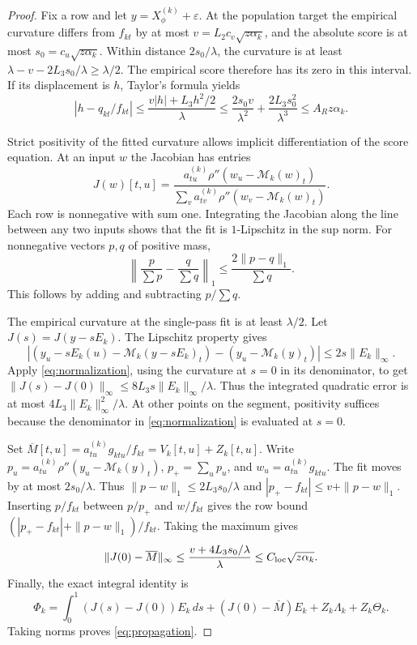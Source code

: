 \documentclass[11pt]{article}
\newcommand{\norm}[1]{\lVert#1\rVert}
\theoremstyle{remark}
\begin{document}
\begin{proof}
Fix a row and let \(y=X_\phi^{(k)}+\varepsilon\).
At the population target the empirical curvature differs from \(f_{kt}\)
by at most \(v=L_2c_v\sqrt{z\alpha_k}\), and the absolute score is at most
\(s_0=c_u\sqrt{z\alpha_k}\).
Within distance \(2s_0/\lambda\), the curvature is at least
\(\lambda-v-2L_3s_0/\lambda\ge\lambda/2\).
The empirical score therefore has its zero in this interval.
If its displacement is \(h\), Taylor's formula yields
\[
 |h-q_{kt}/f_{kt}|
 \le\frac{v|h|+L_3h^2/2}{\lambda}
 \le\frac{2s_0v}{\lambda^2}+\frac{2L_3s_0^2}{\lambda^3}
 \le A_Rz\alpha_k .
\]

Strict positivity of the fitted curvature allows implicit differentiation
of the score equation. At an input \(w\) the Jacobian has entries
\[
 J(w)[t,u]=
 \frac{a_{tu}^{(k)}\rho''(w_u-\mathcal M_k(w)_t)}
      {\sum_v a_{tv}^{(k)}\rho''(w_v-\mathcal M_k(w)_t)}.
\]
Each row is nonnegative with sum one. Integrating the Jacobian along
the line between any two inputs shows that the fit is \(1\)-Lipschitz in
the sup norm. For nonnegative vectors \(p,q\) of
positive mass,
\begin{equation}
 \left\|\frac p{\sum p}-\frac q{\sum q}\right\|_1
       \le\frac{2\|p-q\|_1}{\sum q}.
 \label{eq:normalization}
\end{equation}
This follows by adding and subtracting \(p/\sum q\).

The empirical curvature at the single-pass fit is at least \(\lambda/2\).
Let \(J(s)=J(y-sE_k)\). The Lipschitz property gives
\[
 |(y_u-sE_k(u)-\mathcal M_k(y-sE_k)_t)
       -(y_u-\mathcal M_k(y)_t)|
       \le2s\norm{E_k}_\infty .
\]
Apply \eqref{eq:normalization}, using the curvature at \(s=0\) in its
denominator, to get
\(\norm{J(s)-J(0)}_\infty\le8L_3s\norm{E_k}_\infty/\lambda\).
Thus the integrated quadratic error is at most
\(4L_3\norm{E_k}_\infty^2/\lambda\).
At other points on the segment, positivity suffices because the denominator
in \eqref{eq:normalization} is evaluated at \(s=0\).

Set \(\overline M[t,u]=a_{tu}^{(k)}g_{ktu}/f_{kt}=V_k[t,u]+Z_k[t,u]\).
Write \(p_u=a_{tu}^{(k)}\rho''(y_u-\mathcal M_k(y)_t)\),
\(p_+=\sum_u p_u\), and \(w_u=a_{tu}^{(k)}g_{ktu}\). The fit moves by
at most \(2s_0/\lambda\).
Thus \(\|p-w\|_1\le 2L_3s_0/\lambda\) and
\(|p_+-f_{kt}|\le v+\|p-w\|_1\). Inserting \(p/f_{kt}\) between
\(p/p_+\) and \(w/f_{kt}\) gives the row bound
\((|p_+-f_{kt}|+\|p-w\|_1)/f_{kt}\). Taking the maximum gives
\[
 \norm{J(0)-\overline M}_\infty
 \le\frac{v+4L_3s_0/\lambda}{\lambda}
 \le C_{\rm loc}\sqrt{z\alpha_k}.
\]
Finally, the exact integral identity is
\[
 \Phi_k=\int_0^1(J(s)-J(0))E_k\,ds
          +(J(0)-\overline M)E_k+Z_k\Lambda_k+Z_k\Theta_k .
\]
Taking norms proves \eqref{eq:propagation}.
\end{proof}
\end{document}
